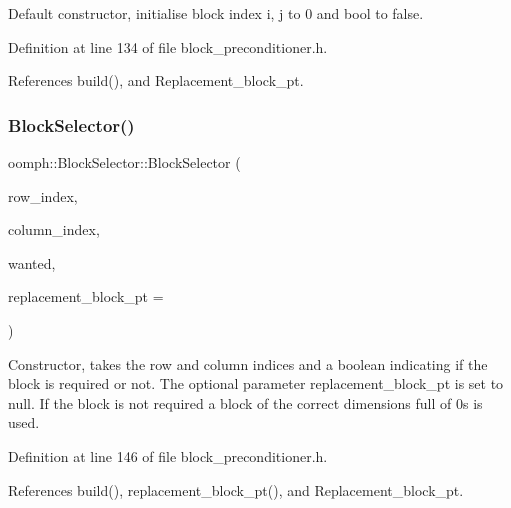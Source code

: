 Default constructor, initialise block index i, j to 0 and bool to false. 



Definition at line 134 of file block\+\_\+preconditioner.\+h.



References build(), and Replacement\+\_\+block\+\_\+pt.

\mbox{\label{classoomph_1_1BlockSelector_a8da9f5e41598377786de44af3ddb26b3}} 
\subsubsection{\texorpdfstring{Block\+Selector()}{BlockSelector()}\hspace{0.1cm}{\footnotesize\ttfamily [2/2]}}
{\footnotesize\ttfamily oomph\+::\+Block\+Selector\+::\+Block\+Selector (\begin{DoxyParamCaption}\item[{const unsigned \&}]{row\+\_\+index,  }\item[{const unsigned \&}]{column\+\_\+index,  }\item[{const bool \&}]{wanted,  }\item[{\hyperlink{classoomph_1_1CRDoubleMatrix}{C\+R\+Double\+Matrix} $\ast$}]{replacement\+\_\+block\+\_\+pt = {} }\end{DoxyParamCaption})\hspace{0.3cm}{\ttfamily [inline]}}



Constructor, takes the row and column indices and a boolean indicating if the block is required or not. The optional parameter replacement\+\_\+block\+\_\+pt is set to null. If the block is not required a block of the correct dimensions full of 0s is used. 



Definition at line 146 of file block\+\_\+preconditioner.\+h.



References build(), replacement\+\_\+block\+\_\+pt(), and Replacement\+\_\+block\+\_\+pt.

\mbox{\label{classoomph_1_1BlockSelector_a591da9d609cad2e823380782a3de24a6}} 
